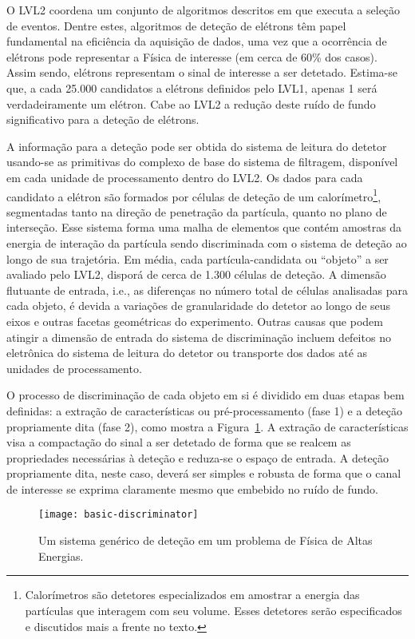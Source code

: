 O LVL2 coordena um conjunto de algoritmos descritos em  que
executa a seleção de eventos. Dentre estes, algoritmos de deteção de elétrons
têm papel fundamental na eficiência da aquisição de dados, uma vez que a
ocorrência de elétrons pode representar a Física de interesse (em cerca de
60\% dos casos). Assim sendo, elétrons representam o sinal de interesse a ser
detetado. Estima-se que, a cada 25.000 candidatos a elétrons definidos pelo
LVL1, apenas 1 será verdadeiramente um elétron. Cabe ao LVL2 a redução deste
ruído de fundo significativo para a deteção de elétrons.

A informação para a deteção pode ser obtida do sistema de leitura do detetor
usando-se as primitivas do complexo  de base do sistema de
filtragem, disponível em cada unidade de processamento dentro do LVL2. Os
dados para cada candidato a elétron são formados por células de deteção de um
calorímetro\footnote{Calorímetros são detetores especializados em amostrar a
energia das partículas que interagem com seu volume. Esses detetores serão
especificados e discutidos mais a frente no texto.}, segmentadas tanto na
direção de penetração da partícula, quanto no plano de interseção. Esse
sistema forma uma malha de elementos que contém amostras da energia de
interação da partícula sendo discriminada com o sistema de deteção ao longo
de sua trajetória. Em média, cada partícula-candidata ou ``objeto'' a ser
avaliado pelo LVL2, disporá de cerca de 1.300 células de deteção. A dimensão
flutuante de entrada, i.e., as diferenças no número total de células
analisadas para cada objeto, é devida a variações de granularidade do detetor
ao longo de seus eixos e outras facetas geométricas do experimento. Outras
causas que podem atingir a dimensão de entrada do sistema de discriminação
incluem defeitos no eletrônica do sistema de leitura do detetor ou transporte
dos dados até as unidades de processamento.

O processo de discriminação de cada objeto em si é dividido em duas etapas bem
definidas: a extração de características ou pré-processamento (fase 1) e a
deteção propriamente dita (fase 2), como mostra a
Figura~\ref{fig:intro-disc}. A extração de características visa a compactação
do sinal a ser detetado de forma que se realcem as propriedades necessárias à
deteção e reduza-se o espaço de entrada. A deteção propriamente dita, neste
caso, deverá ser simples e robusta de forma que o canal de interesse se
exprima claramente mesmo que embebido no ruído de fundo.

\begin{figure}
\begin{center}
\texttt{[image: basic-discriminator]}
\end{center}
\caption{Um sistema genérico de deteção em um problema de Física de Altas
Energias.}
\label{fig:intro-disc}
\end{figure}

